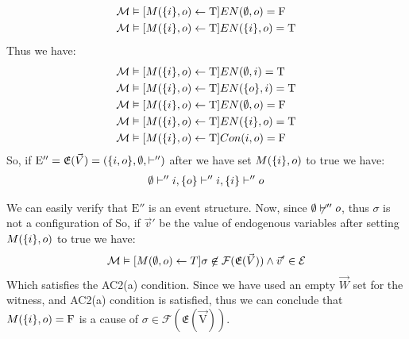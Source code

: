 \begin{example}
\begin{align*}
        \mathcal{M} & \vDash [M(\{i\},o)\leftarrow \mathrm{T}] EN(\emptyset,o) = \mathrm{F}    \\
        \mathcal{M} & \vDash [M(\{i\},o)\leftarrow \mathrm{T}] EN(\{i\},o) = \mathrm{T}    
    \end{align*}
    Thus we have:
    \begin{align*}
        \mathcal{M} & \vDash [M(\{i\},o)\leftarrow \mathrm{T}]EN(\emptyset,i) = \mathrm{T}    \\
        \mathcal{M} & \vDash [M(\{i\},o)\leftarrow \mathrm{T}]EN(\{o\},i) = \mathrm{T} \\
        \mathcal{M} & \vDash [M(\{i\},o)\leftarrow \mathrm{T}]EN(\emptyset,o) = \mathrm{F}    \\
        \mathcal{M} & \vDash [M(\{i\},o)\leftarrow \mathrm{T}]EN(\{i\},o) = \mathrm{T} \\
        \mathcal{M} & \vDash [M(\{i\},o)\leftarrow \mathrm{T}]Con(i,o) = \mathrm{F}   
    \end{align*}    
    So, if $\mathrm{E}'' = \mathfrak{E}(\vec V) = (\{i,o\},\emptyset, \vdash'')$
    after we have set $M(\{i\},o)$ to true we have:
    \begin{align*}
        \emptyset \vdash'' i, \{o\} \vdash'' i, \{i\} \vdash '' o
    \end{align*}
    \begin{center}
    \end{center}
    We can easily verify that $\mathrm{E}''$ is an event structure.
    Now, since $\emptyset \not \vdash'' o$, thus $\sigma$ is not a configuration of
    So, if $\vec v'$ be the value of endogenous variables after setting
    $M(\{i\},o)$ to true we have:
    \begin{align*}
        \mathcal{M} \vDash [M(\emptyset,o) \leftarrow T] \sigma \not \in \mathcal{F}(\mathfrak{E}(\vec V))
        \wedge \vec v' \in \mathcal{E}
    \end{align*}
    Which satisfies the AC2(a) condition.
    Since we have used an empty $\vec W$ set for the witness, and AC2(a)
    condition is satisfied, thus we can conclude that $M(\{i\},o) = \mathrm{F}$ is a
    cause of $\sigma \in \mathcal{F}(\mathrm{\mathfrak{E}( \vec V)})$.
\end{example}

